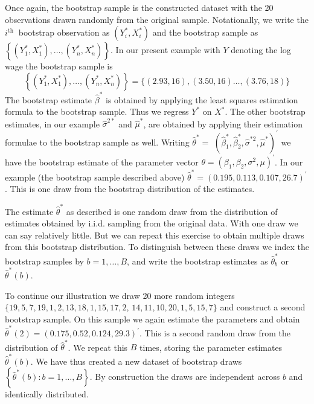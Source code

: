 \documentclass[10pt]{article}
\begin{document}
Once again, the bootstrap sample is the constructed dataset with the 20 observations drawn randomly from the original sample. Notationally, we write the $i^{\text {th }}$ bootstrap observation as $\left(Y_{i}^{*}, X_{i}^{*}\right)$ and the bootstrap sample as $\left\{\left(Y_{1}^{*}, X_{1}^{*}\right), \ldots,\left(Y_{n}^{*}, X_{n}^{*}\right)\right\}$. In our present example with $Y$ denoting the log wage the bootstrap sample is
$$
\left\{\left(Y_{1}^{*}, X_{1}^{*}\right), \ldots,\left(Y_{n}^{*}, X_{n}^{*}\right)\right\}=\{(2.93,16),(3.50,16) \ldots,(3.76,18)\}
$$
The bootstrap estimate $\widehat{\beta}^{*}$ is obtained by applying the least squares estimation formula to the bootstrap sample. Thus we regress $Y^{*}$ on $X^{*}$. The other bootstrap estimates, in our example $\widehat{\sigma}^{2 *}$ and $\widehat{\mu}^{*}$, are obtained by applying their estimation formulae to the bootstrap sample as well. Writing $\widehat{\theta}^{*}=$ $\left(\widehat{\beta}_{1}^{*}, \widehat{\beta}_{2}^{*}, \widehat{\sigma}^{* 2}, \widehat{\mu}^{*}\right)^{\prime}$ we have the bootstrap estimate of the parameter vector $\theta=\left(\beta_{1}, \beta_{2}, \sigma^{2}, \mu\right)^{\prime}$. In our example (the bootstrap sample described above) $\widehat{\theta}^{*}=(0.195,0.113,0.107,26.7)^{\prime}$. This is one draw from the bootstrap distribution of the estimates.

The estimate $\widehat{\theta}^{*}$ as described is one random draw from the distribution of estimates obtained by i.i.d. sampling from the original data. With one draw we can say relatively little. But we can repeat this exercise to obtain multiple draws from this bootstrap distribution. To distinguish between these draws we index the bootstrap samples by $b=1, \ldots, B$, and write the bootstrap estimates as $\widehat{\theta}_{b}^{*}$ or $\widehat{\theta}^{*}(b)$.

To continue our illustration we draw 20 more random integers $\{19,5,7,19,1,2,13,18,1,15,17,2$, $14,11,10,20,1,5,15,7\}$ and construct a second bootstrap sample. On this sample we again estimate the parameters and obtain $\widehat{\theta}^{*}(2)=(0.175,0.52,0.124,29.3)^{\prime}$. This is a second random draw from the distribution of $\widehat{\theta}^{*}$. We repeat this $B$ times, storing the parameter estimates $\widehat{\theta}^{*}(b)$. We have thus created a new dataset of bootstrap draws $\left\{\widehat{\theta}^{*}(b): b=1, \ldots, B\right\}$. By construction the draws are independent across $b$ and identically distributed.
\end{document}

